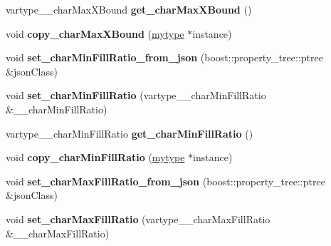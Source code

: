 \begin{DoxyCompactItemize}
vartype\+\_\+\+\_\+char\+Max\+X\+Bound {\bfseries get\+\_\+char\+Max\+X\+Bound} ()
\item 
\mbox{\label{classfilter_1_1algos_1_1_i_d_plate_rectifier_afc854b659fcbf6cce12a8896245f3966}} 
void {\bfseries copy\+\_\+char\+Max\+X\+Bound} (\hyperlink{classfilter_1_1algos_1_1_i_d_plate_rectifier}{mytype} $\ast$instance)
\item 
\mbox{\label{classfilter_1_1algos_1_1_i_d_plate_rectifier_a7159161911f73305d8e60b8e333657cb}} 
void {\bfseries set\+\_\+char\+Min\+Fill\+Ratio\+\_\+from\+\_\+json} (boost\+::property\+\_\+tree\+::ptree \&json\+Class)
\item 
\mbox{\label{classfilter_1_1algos_1_1_i_d_plate_rectifier_af39245df41a376ac4366b379f6993b46}} 
void {\bfseries set\+\_\+char\+Min\+Fill\+Ratio} (vartype\+\_\+\+\_\+char\+Min\+Fill\+Ratio \&\+\_\+\+\_\+char\+Min\+Fill\+Ratio)
\item 
\mbox{\label{classfilter_1_1algos_1_1_i_d_plate_rectifier_ac4766ecb98d1d366e96e18be8cf39eb7}} 
vartype\+\_\+\+\_\+char\+Min\+Fill\+Ratio {\bfseries get\+\_\+char\+Min\+Fill\+Ratio} ()
\item 
\mbox{\label{classfilter_1_1algos_1_1_i_d_plate_rectifier_a0ad869103048e46ac0e57b072785b951}} 
void {\bfseries copy\+\_\+char\+Min\+Fill\+Ratio} (\hyperlink{classfilter_1_1algos_1_1_i_d_plate_rectifier}{mytype} $\ast$instance)
\item 
\mbox{\label{classfilter_1_1algos_1_1_i_d_plate_rectifier_ad103ca4d9c5f21c32e30682b8e7c3a3f}} 
void {\bfseries set\+\_\+char\+Max\+Fill\+Ratio\+\_\+from\+\_\+json} (boost\+::property\+\_\+tree\+::ptree \&json\+Class)
\item 
\mbox{\label{classfilter_1_1algos_1_1_i_d_plate_rectifier_acb7e9e7f666c97c56c1f3a8e4c904d38}} 
void {\bfseries set\+\_\+char\+Max\+Fill\+Ratio} (vartype\+\_\+\+\_\+char\+Max\+Fill\+Ratio \&\+\_\+\+\_\+char\+Max\+Fill\+Ratio)
\item 

\end{DoxyCompactItemize}
